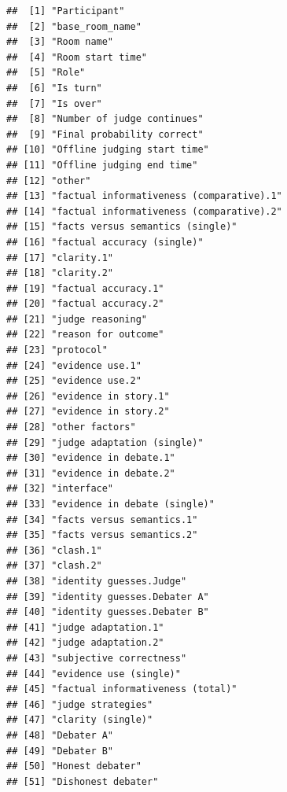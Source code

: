 \documentclass[
]{article}
\begin{document}
\begin{verbatim}
##  [1] "Participant"                            
##  [2] "base_room_name"                         
##  [3] "Room name"                              
##  [4] "Room start time"                        
##  [5] "Role"                                   
##  [6] "Is turn"                                
##  [7] "Is over"                                
##  [8] "Number of judge continues"              
##  [9] "Final probability correct"              
## [10] "Offline judging start time"             
## [11] "Offline judging end time"               
## [12] "other"                                  
## [13] "factual informativeness (comparative).1"
## [14] "factual informativeness (comparative).2"
## [15] "facts versus semantics (single)"        
## [16] "factual accuracy (single)"              
## [17] "clarity.1"                              
## [18] "clarity.2"                              
## [19] "factual accuracy.1"                     
## [20] "factual accuracy.2"                     
## [21] "judge reasoning"                        
## [22] "reason for outcome"                     
## [23] "protocol"                               
## [24] "evidence use.1"                         
## [25] "evidence use.2"                         
## [26] "evidence in story.1"                    
## [27] "evidence in story.2"                    
## [28] "other factors"                          
## [29] "judge adaptation (single)"              
## [30] "evidence in debate.1"                   
## [31] "evidence in debate.2"                   
## [32] "interface"                              
## [33] "evidence in debate (single)"            
## [34] "facts versus semantics.1"               
## [35] "facts versus semantics.2"               
## [36] "clash.1"                                
## [37] "clash.2"                                
## [38] "identity guesses.Judge"                 
## [39] "identity guesses.Debater A"             
## [40] "identity guesses.Debater B"             
## [41] "judge adaptation.1"                     
## [42] "judge adaptation.2"                     
## [43] "subjective correctness"                 
## [44] "evidence use (single)"                  
## [45] "factual informativeness (total)"        
## [46] "judge strategies"                       
## [47] "clarity (single)"                       
## [48] "Debater A"                              
## [49] "Debater B"                              
## [50] "Honest debater"                         
## [51] "Dishonest debater"                      

\end{verbatim}
\end{document}
